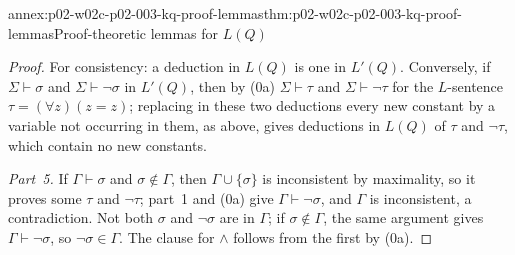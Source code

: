\begin{annexitem}{annex:p02-w02c-p02-003-kq-proof-lemmas}{thm:p02-w02c-p02-003-kq-proof-lemmas}{Proof-theoretic lemmas for \(L(Q)\)}
\begin{proof}
For consistency: a deduction in \(L(Q)\) is one in \(L'(Q)\).  Conversely,
if \(\Sigma\vdash\sigma\) and \(\Sigma\vdash\neg\sigma\) in \(L'(Q)\), then
by (0a) \(\Sigma\vdash\tau\) and \(\Sigma\vdash\neg\tau\) for the
\(L\)-sentence \(\tau=(\forall z)(z=z)\); replacing in these two
deductions every new constant by a variable not occurring in them, as
above, gives deductions in \(L(Q)\) of \(\tau\) and \(\neg\tau\), which
contain no new constants.

\emph{Part~5.}  If \(\Gamma\vdash\sigma\) and \(\sigma\notin\Gamma\), then
\(\Gamma\cup\{\sigma\}\) is inconsistent by maximality, so it proves some
\(\tau\) and \(\neg\tau\); part~1 and (0a) give \(\Gamma\vdash\neg\sigma\),
and \(\Gamma\) is inconsistent, a contradiction.  Not both \(\sigma\) and
\(\neg\sigma\) are in \(\Gamma\); if \(\sigma\notin\Gamma\), the same
argument gives \(\Gamma\vdash\neg\sigma\), so \(\neg\sigma\in\Gamma\).  The
clause for \(\land\) follows from the first by (0a).
\end{proof}
\end{annexitem}

